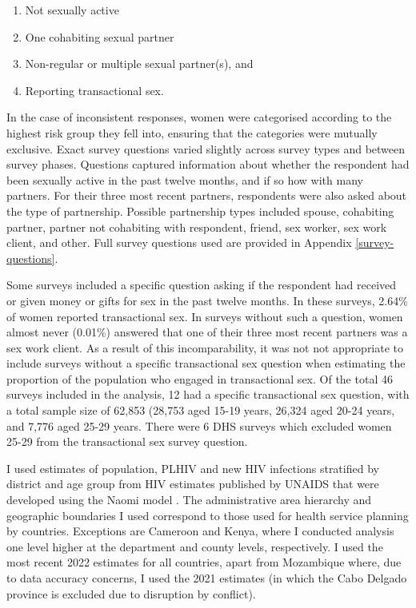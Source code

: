 \documentclass[a4paper, nobind]{templates/ociamthesis}
\providecommand{\tightlist}{%
  \setlength{\itemsep}{0pt}\setlength{\parskip}{0pt}}
\begin{document}
\begin{enumerate}
\def\labelenumi{\arabic{enumi}.}
\tightlist
\item
  Not sexually active
\item
  One cohabiting sexual partner
\item
  Non-regular or multiple sexual partner(s), and
\item
  Reporting transactional sex.
\end{enumerate}

In the case of inconsistent responses, women were categorised according to the highest risk group they fell into, ensuring that the categories were mutually exclusive.
Exact survey questions varied slightly across survey types and between survey phases.
Questions captured information about whether the respondent had been sexually active in the past twelve months, and if so how with many partners.
For their three most recent partners, respondents were also asked about the type of partnership.
Possible partnership types included spouse, cohabiting partner, partner not cohabiting with respondent, friend, sex worker, sex work client, and other.
Full survey questions used are provided in Appendix \ref{survey-questions}.

Some surveys included a specific question asking if the respondent had received or given money or gifts for sex in the past twelve months.
In these surveys, 2.64\% of women reported transactional sex.
In surveys without such a question, women almost never (0.01\%) answered that one of their three most recent partners was a sex work client.
As a result of this incomparability, it was not not appropriate to include surveys without a specific transactional sex question when estimating the proportion of the population who engaged in transactional sex.
Of the total 46 surveys included in the analysis, 12 had a specific transactional sex question, with a total sample size of 62,853 (28,753 aged 15-19 years, 26,324 aged 20-24 years, and 7,776 aged 25-29 years.
There were 6 DHS surveys which excluded women 25-29 from the transactional sex survey question.

I used estimates of population, PLHIV and new HIV infections stratified by district and age group from HIV estimates published by UNAIDS that were developed using the Naomi model \autocite{eaton2021naomi}.
The administrative area hierarchy and geographic boundaries I used correspond to those used for health service planning by countries.
Exceptions are Cameroon and Kenya, where I conducted analysis one level higher at the department and county levels, respectively.
I used the most recent 2022 estimates for all countries, apart from Mozambique where, due to data accuracy concerns, I used the 2021 estimates (in which the Cabo Delgado province is excluded due to disruption by conflict).
\end{document}
